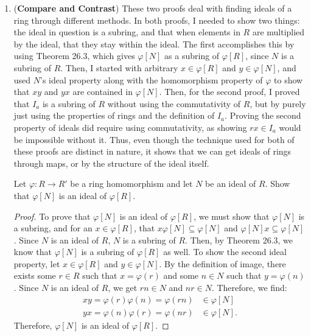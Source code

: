 \documentclass[12pt, oneside]{book}
\newcommand{\pf}[1]{
    \begin{customframedproof}[linecolor=horange!75]
        \begin{proof}
        #1
        \end{proof}
    \end{customframedproof}
}
\begin{document}
\begin{enumerate}[label=\textbf{\arabic*.}]
\newpage
    \item (\textbf{Compare and Contrast}) These two proofs deal with finding ideals of a ring through different methods. In both proofs, I needed to show two things: the ideal in question is a subring, and that when elements in \(R\) are multiplied by the ideal, that they stay within the ideal. The first accomplishes this by using Theorem 26.3, which gives \(\varphi[N]\) as a subring of \(\varphi[R]\), since \(N\) is a subring of \(R\). Then, I started with arbitrary \(x \in \varphi[R]\) and \(y \in \varphi[N]\), and used \(N\)'s ideal property along with the homomorphism property of \(\varphi\) to show that \(xy\) and \(yx\) are contained in \(\varphi[N]\). Then, for the second proof, I proved that \(I_{a}\) is a subring of \(R\) without using the commutativity of \(R\), but by purely just using the properties of rings and the definition of \(I_{a}\). Proving the second property of ideals did require using commutativity, as showing \(rx \in I_{a}\) would be impossible without it. Thus, even though the technique used for both of these proofs are distinct in nature, it shows that we can get ideals of rings through maps, or by the structure of the ideal itself.
    
    Let \(\varphi : R \to R'\) be a ring homomorphism and let \(N\) be an ideal of \(R\). Show that \(\varphi[N]\) is an ideal of \(\varphi[R]\).
    \pf{
        To prove that \(\varphi[N]\) is an ideal of \(\varphi[R]\), we must show that \(\varphi[N]\) is a subring, and for an \(x \in \varphi[R]\), that \(x\varphi[N] \subseteq \varphi[N]\) and \(\varphi[N]x \subseteq \varphi[N]\). Since \(N\) is an ideal of \(R\), \(N\) is a subring of \(R\). Then, by Theorem 26.3, we know that \(\varphi[N]\) is a subring of \(\varphi[R]\) as well. To show the second ideal property, let \(x \in \varphi[R]\) and \(y \in \varphi[N]\). By the definition of image, there exists some \(r \in R\) such that \(x = \varphi(r)\) and some \(n \in N\) such that \(y = \varphi(n)\). Since \(N\) is an ideal of \(R\), we get \(rn \in N\) and \(nr \in N\). Therefore, we find:
        \begin{align*}
            xy = \varphi(r)\varphi(n) = \varphi(rn) &\in \varphi[N] \\
            yx = \varphi(n)\varphi(r) = \varphi(nr) &\in \varphi[N].
        \end{align*}
        Therefore, \(\varphi[N]\) is an ideal of \(\varphi[R]\).
    }


\end{enumerate}
\end{document}
